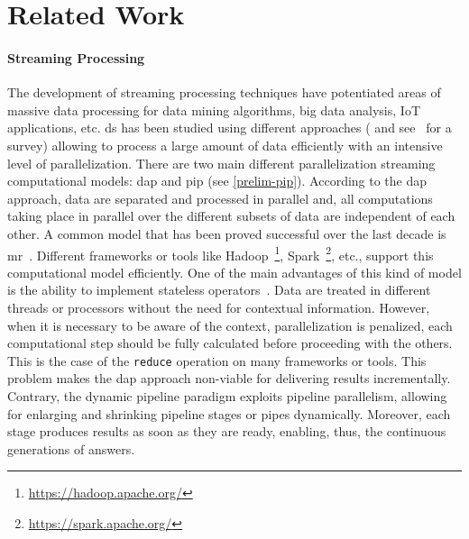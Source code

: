 \section{Related Work}\label{section:related-work}

\paragraph{Streaming Processing}
The development of streaming processing techniques have potentiated areas of massive data processing for data mining algorithms, big data analysis, IoT applications, etc.  \acrfull{ds} has been studied using different approaches (\cite{SA-libro,exploiting, onthefly} and see~\cite{hr19} for a survey) allowing to process a large amount of data efficiently with an intensive level of parallelization. There are two main different parallelization streaming computational models: \acrfull{dap} and \acrfull{pip} (see \autoref{prelim-pip}). According to the \acrshort{dap} approach, data are separated and processed in parallel and, all  computations taking place in parallel over the different subsets of data are independent of each other. 
A common model that has been proved successful over the last decade is \acrfull{mr}~\cite{mapreduce}. Different frameworks or tools like Hadoop~\footnote{\url{https://hadoop.apache.org/}}, Spark~\footnote{\url{https://spark.apache.org/}}, etc., support this computational model efficiently. One of the main advantages of this kind of model is the ability to implement stateless operators~\cite{hr19}. Data are treated in different threads or processors without the need for contextual information. However, when it is necessary to be aware of the context, parallelization is penalized, each computational step should be fully calculated before proceeding with the others. This is the case of the  \texttt{reduce} operation on many frameworks or tools. This problem makes the \acrshort{dap} approach non-viable for delivering results incrementally. Contrary, the dynamic pipeline paradigm exploits pipeline parallelism, allowing for enlarging and shrinking pipeline stages or pipes dynamically. Moreover, each stage produces results as soon as they are ready, enabling, thus, the continuous generations of answers.  

